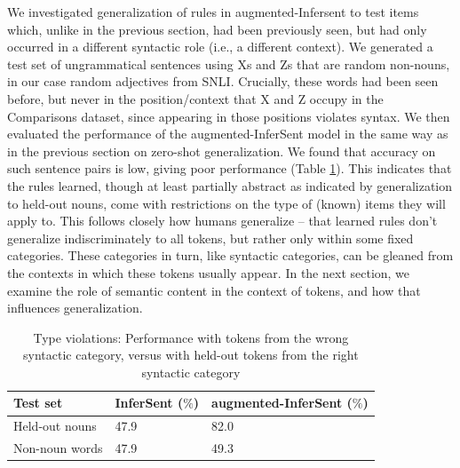 
We investigated generalization of rules in augmented-Infersent to test items which, unlike in the previous section, had been previously seen, but had only occurred in a different syntactic role (i.e., a different context). We generated a test set of ungrammatical sentences using Xs and Zs that are random non-nouns, in our case random adjectives from SNLI. Crucially, these words had been seen before, but never in the position/context that X and Z occupy in the Comparisons dataset, since appearing in those positions violates syntax. We then evaluated the performance of the augmented-InferSent model in the same way as in the previous section on zero-shot generalization. We found that accuracy on such sentence pairs is low, giving poor performance (Table \ref{tab:type}). This indicates that the rules learned, though at least partially abstract as indicated by generalization to held-out nouns, come with restrictions on the type of (known) items they will apply to. This follows closely how humans generalize -- that learned rules don't generalize indiscriminately to all tokens, but rather only within some fixed categories. These categories in turn, like syntactic categories, can be gleaned from the contexts in which these tokens usually appear. In the next section, we examine the role of semantic content in the context of tokens, and how that influences generalization.


\begin{table}[h!]
  \begin{center}
    \begin{tabular}{lll}
    \toprule
      Test set  & InferSent ($\%$) & augmented-InferSent ($\%$)\\
    \midrule
    Held-out nouns & 47.9 & 82.0\\
    Non-noun words & 47.9 & 49.3 \\
\bottomrule
\end{tabular}
\end{center}
\caption{Type violations: Performance with tokens from the wrong syntactic category, versus with held-out tokens from the right syntactic category}
  \label{tab:type}
\end{table}

